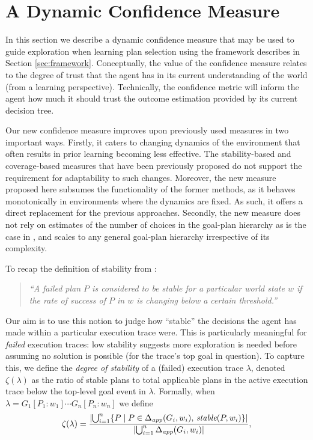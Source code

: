 


\section{A Dynamic Confidence Measure}\label{sec:confidence}

In this section we describe a dynamic confidence measure that may be used to guide exploration when learning plan selection using the framework describes in Section \ref{sec:framework}. Conceptually, the value of the confidence measure relates to the degree of trust that the agent has in its current understanding of the world (from a learning perspective). Technically, the confidence metric will inform the agent how much it should trust the outcome estimation provided by its current decision tree.

Our new confidence measure improves upon previously used measures in two important ways. 
%
Firstly, it caters to changing dynamics of the environment that often results in prior learning becoming less effective. The stability-based \cite{airiau09:enhancing} and coverage-based \cite{singh10:extending,singh10:learning} measures that have been previously proposed do not support the requirement for adaptability to such changes. Moreover, the new measure proposed here subsumes the functionality of the former methods, as it behaves monotonically in environments where the dynamics are fixed. As such, it offers a direct replacement for the previous approaches. 
%
Secondly, the new measure does not rely on estimates of the number of choices in the goal-plan hierarchy as is the case in \cite{singh10:extending,singh10:learning}, and scales to any general goal-plan hierarchy irrespective of its complexity.


To recap the definition of stability from \cite{singh10:learning}:

\begin{quote}
\emph{``A failed plan $P$ is considered to be stable for a particular world state $w$ if the rate of success of $P$ in $w$ is changing below a certain threshold.''}
\end{quote} 

\newcommand{\ds}{\zeta}
\newcommand{\app}{\mathname{app}}
\newcommand{\stable}{\mathname{stable}}

Our aim is to use this notion to judge how ``stable'' the decisions the agent has made within a particular execution trace were. This is particularly meaningful for \emph{failed} execution traces: low stability suggests more exploration is needed before assuming no solution is possible (for the trace's top goal in question).
To capture this, we define the \emph{degree of stability} of a (failed) execution trace $\lambda$, denoted $\ds(\lambda)$ as the ratio of stable plans to total applicable plans in the active execution trace below the top-level goal event in $\lambda$. Formally, when $\lambda= G_1[P_1:w_1] \cdots G_n[P_n:w_n]$ we define 
\[
\ds(\lambda) = 
	\frac{ 
			\card{ \bigcup_{i=1}^n \set{P \mid P \in \Delta_{\app}(G_i,w_i),\, \stable(P,w_i)} } 
		}
		{
			\card{	\bigcup_{i=1}^n \Delta_{\app}(G_i,w_i) } 
		},
\]


